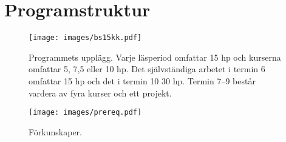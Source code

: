 \chapter{Programstruktur\label{app:progstrukt}}


\begin{figure}[h]
\centering
\texttt{[image: images/bs15kk.pdf]}
\caption{Programmets upplägg. Varje läsperiod omfattar 15 hp och kurserna omfattar 5, 7,5 eller 10 hp. Det självständiga arbetet i termin 6 omfattar 15 hp och det i termin 10 30 hp. Termin 7--9 består vardera av fyra kurser och ett projekt.}
\end{figure}

\begin{sidewaysfigure}[p]
\centering
\texttt{[image: images/prereq.pdf]}
\caption{Förkunskaper.}
\end{sidewaysfigure}

